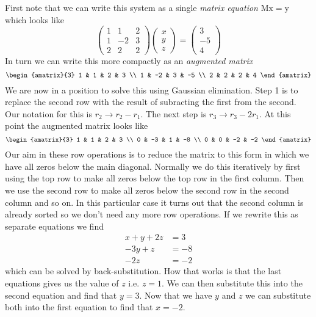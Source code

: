 First note that we can write this system as a single \emph{matrix equation}
$\mathrm{Mx} = \mathrm{y}$ which looks like
\[
    \begin{pmatrix}
        1 & 1 & 2 \\
        1 & -2 & 3 \\
        2 & 2 & 2
    \end{pmatrix}
    \begin{pmatrix}
        x \\ y \\ z
    \end{pmatrix}
       =
    \begin{pmatrix}
        3 \\ -5 \\ 4
    \end{pmatrix}
\]
In turn we can write this more compactly as an \emph{augmented matrix}
\[
    \begin{amatrix}{3}
        1 & 1 & 2 & 3 \\
        1 & -2 & 3 & -5 \\
        2 & 2 & 2 & 4
    \end{amatrix}
\]
We are now in a position to solve this using Gaussian elimination. Step 1 is
to replace the second row with the result of subracting the first from the
second. Our notation for this is $r_2 \to r_2 - r_1$. The next step is $r_3
\to r_3 - 2r_1$. At this point the augmented matrix looks like
\[
    \begin{amatrix}{3}
        1 & 1 & 2 & 3 \\
        0 & -3 & 1 & -8 \\
        0 & 0 & -2 & -2
    \end{amatrix}
\]
Our aim in these row operations is to reduce the matrix to this form in which
we have all zeros below the main diagonal. Normally we do this iteratively by
first using the top row to make all zeros below the top row in the first
column. Then we use the second row to make all zeros below the second row in
the second column and so on. In this particular case it turns out that the
second column is already sorted so we don't need any more row operations.
If we rewrite this as separate equations we find
\begin{align*}
    x +y + 2z &= 3\\
     -3y + z  &= -8\\
          -2z &= -2
    \label{system1}
\end{align*}
which can be solved by back-substitution. How that works is that the last
equations gives us the value of $z$ i.e. $z=1$. We can then substitute this
into the second equation and find that $y=3$. Now that we have $y$ and $z$ we
can substitute both into the first equation to find that $x=-2$.
\clearpage
